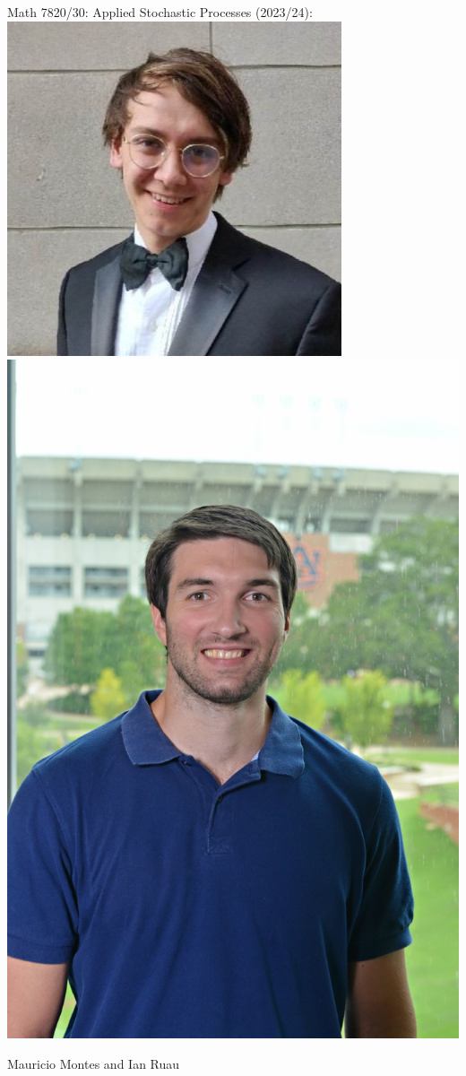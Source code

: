 \documentclass[9pt,table,xcolor=dvipsnames]{beamer}
\begin{document}
\begin{frame}[fragile] %
  \begin{center}
    Math 7820/30: Applied Stochastic Processes (2023/24):
    \includegraphics[scale=0.30]{./figs/mau.jpeg}
    \includegraphics[scale=0.50]{./figs/ruau.jpg}
    \bigskip

    Mauricio Montes and Ian Ruau
  \end{center}
\end{frame}
\end{document}
